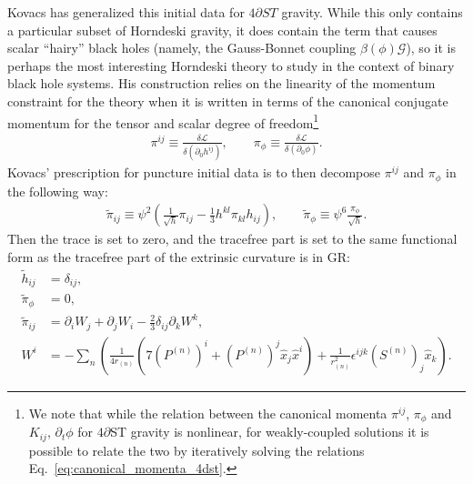 \documentclass{ws-ijmpd}
\begin{document}
Kovacs\cite{Kovacs:2021lgk} has generalized this
initial data for $4\partial ST$ gravity. While this only contains
a particular subset of Horndeski gravity, it does contain the term
that causes scalar ``hairy'' black holes (namely, the
Gauss-Bonnet coupling $\beta\left(\phi\right)\mathcal{G}$),
so it is perhaps the most interesting Horndeski theory to study
in the context of binary black hole systems.
His construction relies on the linearity of the momentum
constraint for the theory when it is written in terms of the
canonical conjugate momentum for the tensor and scalar
degree of freedom\footnote{We note
that while the relation between the canonical momenta
$\pi^{ij}$, $\pi_{\phi}$
and $K_{ij}$, $\partial_t\phi$ for $4\partial$ST gravity
is nonlinear\cite{Julie:2020vov}, for weakly-coupled solutions it is
possible to relate the two by iteratively solving the
relations 
Eq.~\eqref{eq:canonical_momenta_4dst}\cite{Kovacs:2021lgk}.}
\cite{Julie:2020vov,Kovacs:2021lgk}
\begin{align}
\label{eq:canonical_momenta_4dst}
   \pi^{ij}
   \equiv
   \frac{\delta\mathcal{L}}{\delta\left(\partial_0h^{ij}\right)}
   ,\qquad
   \pi_{\phi}
   \equiv
   \frac{\delta\mathcal{L}}{\delta\left(\partial_0\phi\right)}
   .
\end{align}
Kovacs' prescription for puncture initial data is to
then decompose $\pi^{ij}$ and $\pi_{\phi}$ in the following way: 
\begin{align}
   \tilde{\pi}_{ij}
   \equiv
   \psi^2\left(
      \frac{1}{\sqrt{h}}\pi_{ij}
      -
      \frac{1}{3}h^{kl}\pi_{kl}
      h_{ij}
   \right)
   ,\qquad
   \tilde{\pi}_{\phi}
   \equiv
   \psi^6\frac{\pi_{\phi}}{\sqrt{h}}
   .
\end{align}
Then the trace is set to zero, and the tracefree part is
set to the same functional form as the tracefree part of the extrinsic
curvature is in GR:
\begin{subequations}
\begin{align}
   \tilde{h}_{ij}
   &=
   \delta_{ij}
   ,\\
   \tilde{\pi}_{\phi}
   &=
   0
   ,\\
   \tilde{\pi}_{ij}
   &=
   \partial_iW_j
   +
   \partial_jW_i
   -
   \frac{2}{3}\delta_{ij}\partial_kW^k
   ,\\
   W^i
   &=
   -
   \sum_n
      \left(
         \frac{1}{4r_{(n)}}\left(
            7\left(P^{(n)}\right)^i 
            + 
            \left(P^{(n)}\right)^j\hat{x}_j \hat{x}^i
         \right)
         +
         \frac{1}{r_{(n)}^2}\epsilon^{ijk}\left(S^{(n)}\right)_j\hat{x}_k
      \right)
   .
\end{align}
\end{subequations}
\end{document}
